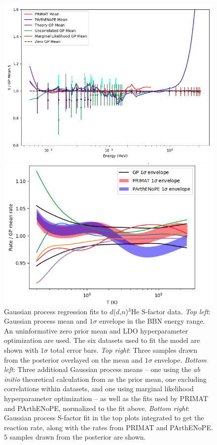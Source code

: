 \documentclass[%
 reprint,
superscriptaddress,
nofootinbib,
 amsmath,amssymb,
 aps,
 pra,
]{revtex4-2}
\begin{document}
\begin{figure}
\begin{minipage}{.48\textwidth}
		\includegraphics[width=\linewidth]{Figures/ddhe3n_S_comp.png}	
	\end{minipage}
	\hspace{0mm}
	\begin{minipage}{.48\textwidth}
    		\centering
		\includegraphics[width=\linewidth]{Figures/ddhe3n_rate.png}	
	\end{minipage}
    	\caption{Gaussian process regression fits to $d$($d$,$n$)$^3$He S-factor data. \textit{Top left}: Gaussian process mean and $1\sigma$ envelope in the BBN energy range. An uninformative zero prior mean and LDO hyperparameter optimization are used. The six datasets \cite{Schulte1972, Krauss1987, Brown1990, Greife1995, Leonard2006} used to fit the model are shown with $1\sigma$ total error bars. \textit{Top right}: Three samples drawn from the posterior overlayed on the mean and $1\sigma$ envelope. \textit{Bottom left}: Three additional Gaussian process means -- one using the \textit{ab initio} theoretical calculation from \cite{Arai2011} as the prior mean, one excluding correlations within datasets, and one using marginal likelihood hyperparameter optimization -- as well as the fits used by PRIMAT and PArthENoPE, normalized to the fit above. \textit{Bottom right}: Gaussian process S-factor fit in the top plots integrated to get the reaction rate, along with the rates from PRIMAT and PArthENoPE. 5 samples drawn from the posterior are shown. }
\end{figure}
\end{document}
